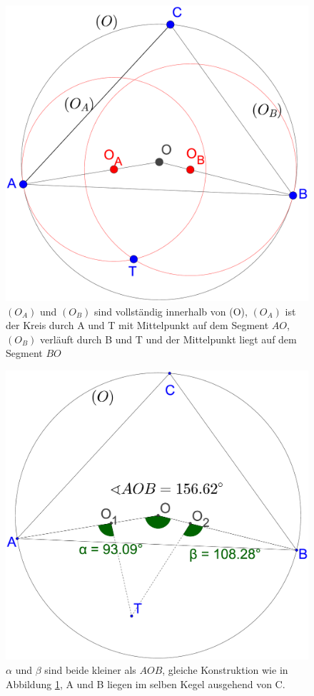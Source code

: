 \documentclass[a4paper,twoside]{IEEEtran}
\begin{document}
\begin{figure}[h!]
\centering
\includegraphics[width=0.7\linewidth]{outward_path_kreise.eps}
\caption{ $(O_A) $ und $(O_B) $ sind vollständig innerhalb von (O), $(O_A) $ ist der Kreis durch A und T mit Mittelpunkt auf dem Segment $AO $, $(O_B) $ verläuft durch B und T und der Mittelpunkt liegt auf dem Segment $BO $} 
\label{fig:outward_path_kreise}
\end{figure}

\begin{figure}[h!]
\centering
\includegraphics[width=0.7\linewidth]{outward_path_winkel.eps}
\caption{ $\alpha $ und $\beta $ sind beide kleiner als $ AOB $, gleiche Konstruktion wie in Abbildung \ref{fig:outward_path_kreise}, A und B liegen im selben Kegel ausgehend von C.}
\label{fig:outward_path_winkel}
\end{figure}
\end{document}
